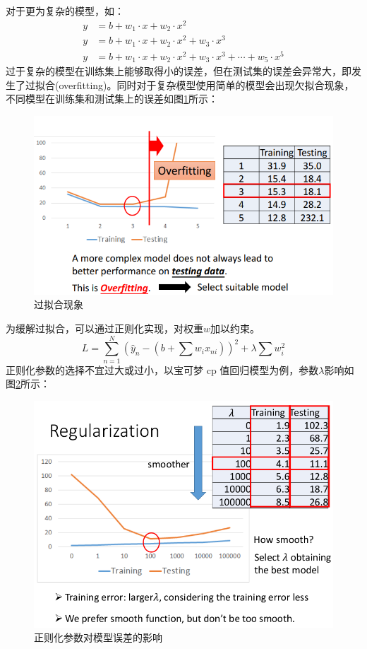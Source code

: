 对于更为复杂的模型，如：
\begin{align*}
	y &= b + w_1 \cdot x + w_2 \cdot x^2 \\
	y &= b + w_1 \cdot x + w_2 \cdot x^2 + w_3 \cdot x^3 \\
	y &= b + w_1 \cdot x + w_2 \cdot x^2 + w_3 \cdot x^3 + \cdots + w_5 \cdot x^5
\end{align*}
过于复杂的模型在训练集上能够取得小的误差，但在测试集的误差会异常大，即发生了过拟合(overfitting)。同时对于复杂模型使用简单的模型会出现欠拟合现象，不同模型在训练集和测试集上的误差如图\ref{fig:overfitting}所示：
\begin{figure}
	\centering
	\includegraphics[scale=0.5]{pic/overfitting.png}
	\caption{过拟合现象}
	\label{fig:overfitting}
\end{figure}
为缓解过拟合，可以通过正则化实现，对权重$w$加以约束。
\[
	L = \sum_{n=1}^{N} \left(\hat{y}_n - (b+ \sum w_i x_{ni}) \right) ^2 + \lambda  \sum w_i^2 
\]
正则化参数的选择不宜过大或过小，以宝可梦 cp 值回归模型为例，参数$\lambda$影响如图\ref{fig:regularization}所示：
\begin{figure}
	\centering
	\includegraphics[scale=0.5]{pic/regularization}
	\caption{正则化参数对模型误差的影响}
	\label{fig:regularization}
\end{figure}
